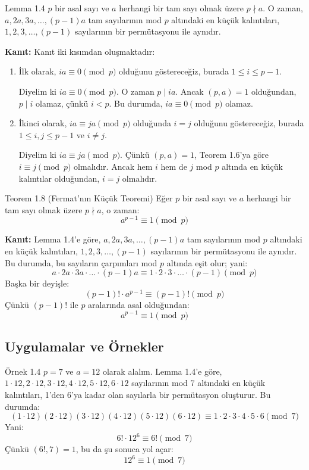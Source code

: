 \documentclass[12pt]{article}
\begin{document}
\begin{theorembox}{Lemma 1.4}
$p$ bir asal sayı ve $a$ herhangi bir tam sayı olmak üzere $p \nmid a$. O zaman, $a, 2a, 3a, \dots, (p-1)a$ tam sayılarının mod $p$ altındaki en küçük kalıntıları, $1, 2, 3, \dots, (p-1)$ sayılarının bir permütasyonu ile aynıdır.

\textbf{Kanıt:}  
Kanıt iki kısımdan oluşmaktadır:
\begin{enumerate}
    \item İlk olarak, $ia \equiv 0 \pmod{p}$ olduğunu göstereceğiz, burada $1 \leq i \leq p - 1$. 
    
    Diyelim ki $ia \equiv 0 \pmod{p}$. O zaman $p \mid ia$. Ancak $(p, a) = 1$ olduğundan, $p \mid i$ olamaz, çünkü $i < p$. Bu durumda, $ia \equiv 0 \pmod{p}$ olamaz.
    
    \item İkinci olarak, $ia \equiv ja \pmod{p}$ olduğunda $i = j$ olduğunu göstereceğiz, burada $1 \leq i, j \leq p - 1$ ve $i \neq j$.
    
    Diyelim ki $ia \equiv ja \pmod{p}$. Çünkü $(p, a) = 1$, Teorem 1.6'ya göre $i \equiv j \pmod{p}$ olmalıdır. Ancak hem $i$ hem de $j$ mod $p$ altında en küçük kalıntılar olduğundan, $i = j$ olmalıdır.
\end{enumerate}
\end{theorembox}

\begin{theorembox}{Teorem 1.8 (Fermat'nın Küçük Teoremi)}
Eğer $p$ bir asal sayı ve $a$ herhangi bir tam sayı olmak üzere $p \nmid a$, o zaman:
\[
a^{p-1} \equiv 1 \pmod{p}
\]

\textbf{Kanıt:}  
Lemma 1.4'e göre, $a, 2a, 3a, \dots, (p-1)a$ tam sayılarının mod $p$ altındaki en küçük kalıntıları, $1, 2, 3, \dots, (p-1)$ sayılarının bir permütasyonu ile aynıdır. Bu durumda, bu sayıların çarpımları mod $p$ altında eşit olur; yani:
\[
a \cdot 2a \cdot 3a \cdot \dots \cdot (p-1)a \equiv 1 \cdot 2 \cdot 3 \cdot \dots \cdot (p-1) \pmod{p}
\]
Başka bir deyişle:
\[
(p-1)! \cdot a^{p-1} \equiv (p-1)! \pmod{p}
\]
Çünkü $(p-1)!$ ile $p$ aralarında asal olduğundan:
\[
a^{p-1} \equiv 1 \pmod{p}
\]
\end{theorembox}

\subsection*{Uygulamalar ve Örnekler}

\begin{examplebox}{Örnek 1.4}
$p = 7$ ve $a = 12$ olarak alalım. Lemma 1.4'e göre, $1 \cdot 12, 2 \cdot 12, 3 \cdot 12, 4 \cdot 12, 5 \cdot 12, 6 \cdot 12$ sayılarının mod 7 altındaki en küçük kalıntıları, 1'den 6'ya kadar olan sayılarla bir permütasyon oluşturur. Bu durumda:
\[
(1 \cdot 12)(2 \cdot 12)(3 \cdot 12)(4 \cdot 12)(5 \cdot 12)(6 \cdot 12) \equiv 1 \cdot 2 \cdot 3 \cdot 4 \cdot 5 \cdot 6 \pmod{7}
\]
Yani:
\[
6! \cdot 12^6 \equiv 6! \pmod{7}
\]
Çünkü $(6!, 7) = 1$, bu da şu sonuca yol açar:
\[
12^6 \equiv 1 \pmod{7}
\]
\end{examplebox}
\end{document}
